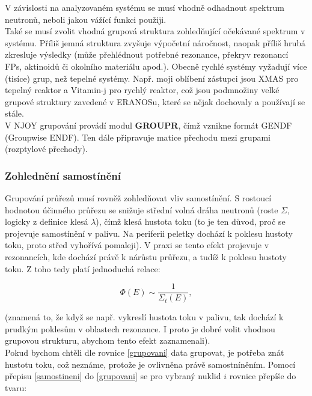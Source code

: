 V závislosti na analyzovaném systému se musí vhodně odhadnout spektrum neutronů, neboli jakou vážící funkci použiji.\\

Také se musí zvolit vhodná grupová struktura zohledňující očekávané spektrum v systému. Příliš jemná struktura zvyšuje výpočetní náročnost, naopak příliš hrubá zkresluje výsledky (může přehlédnout potřebné rezonance, překryv rezonancí FPs, aktinoidů či okolního materiálu apod.). Obecně rychlé systémy vyžadují více (tisíce) grup, než tepelné systémy. Např. moji oblíbení zástupci jsou XMAS pro tepelný reaktor a Vitamin-j pro rychlý reaktor, což jsou podmnožiny velké grupové struktury zavedené v ERANOSu, které se nějak dochovaly a používají se stále.\\

V NJOY grupování provádí modul \textbf{GROUPR}, čímž vznikne formát GENDF (Groupwise ENDF). Ten dále připravuje matice přechodu mezi grupami (rozptylové přechody).

\subsubsection{Zohlednění samostínění}

Grupování průřezů musí rovněž zohledňovat vliv samostínění. S rostoucí hodnotou účinného průřezu se snižuje střední volná dráha neutronů (roste $\Sigma$, logicky z definice klesá $\lambda$), čímž klesá hustota toku (to je ten důvod, proč se projevuje samostínění v palivu. Na periferii peletky dochází k poklesu hustoty toku, proto střed vyhořívá pomaleji). V praxi se tento efekt projevuje v rezonancích, kde dochází právě k nárůstu průřezu, a tudíž k poklesu hustoty toku. Z toho tedy platí jednoduchá relace:

\begin{equation}
  \boxed{
    \Phi(E) \sim \dfrac{1}{\Sigma_t(E)},}
    \label{samostineni}
\end{equation}

\noindent (znamená to, že když se např. vykreslí hustota toku v palivu, tak dochází k prudkým poklesům v oblastech rezonance. I proto je dobré volit vhodnou grupovou strukturu, abychom tento efekt zaznamenali).\\

Pokud bychom chtěli dle rovnice \eqref{grupovani} data grupovat, je potřeba znát hustotu toku, což neznáme, protože je ovlivněna právě samostníněním. Pomocí přepisu \eqref{samostineni} do \eqref{grupovani} se pro vybraný nuklid $i$ rovnice přepíše do tvaru:

